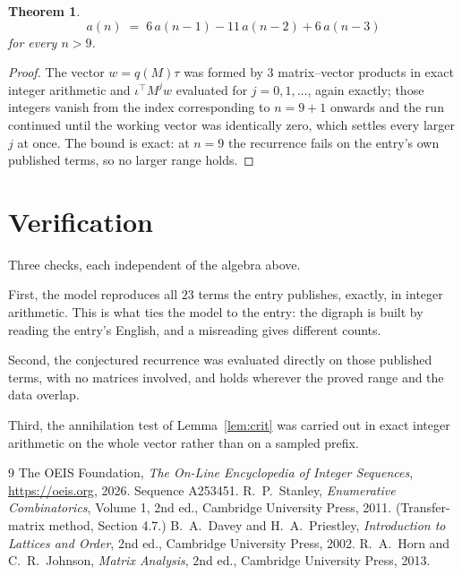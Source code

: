 \documentclass[11pt,a4paper]{article}
\theoremstyle{plain}
\newtheorem{theorem}{Theorem}
\theoremstyle{definition}
\begin{document}
\begin{theorem}
\[
a(n)\;=\;6\,a(n-1) - 11\,a(n-2) + 6\,a(n-3)
\]
for every $n>9$.
\end{theorem}

\begin{proof}
The vector $w=q(M)\tau$ was formed by $3$ matrix--vector products in exact integer
arithmetic and $\iota^{\!\top}M^{j}w$ evaluated for $j=0,1,\dots$, again exactly; those
integers vanish from the index corresponding to $n=9+1$ onwards and the run continued
until the working vector was identically zero, which settles every larger $j$ at once. The bound is exact: at $n=9$ the recurrence fails on the entry's own published terms, so no larger range holds.
\end{proof}

\section{Verification}

Three checks, each independent of the algebra above.

First, the model reproduces all $23$ terms the entry publishes, exactly, in integer
arithmetic. This is what ties the model to the entry: the digraph is built by reading the
entry's English, and a misreading gives different counts.

Second, the conjectured recurrence was evaluated directly on those published terms, with no
matrices involved, and holds wherever the proved range and the data overlap.

Third, the annihilation test of Lemma~\ref{lem:crit} was carried out in exact integer
arithmetic on the whole vector rather than on a sampled prefix.

\begin{thebibliography}{9}
 The OEIS Foundation, \emph{The On-Line Encyclopedia of Integer
Sequences}, \url{https://oeis.org}, 2026. Sequence A253451.
 R.~P.~Stanley, \emph{Enumerative Combinatorics}, Volume 1, 2nd ed.,
Cambridge University Press, 2011. (Transfer-matrix method, Section 4.7.)
 B.~A.~Davey and H.~A.~Priestley, \emph{Introduction to Lattices and
Order}, 2nd ed., Cambridge University Press, 2002.
 R.~A.~Horn and C.~R.~Johnson, \emph{Matrix Analysis}, 2nd ed., Cambridge
University Press, 2013.
\end{thebibliography}
\end{document}

